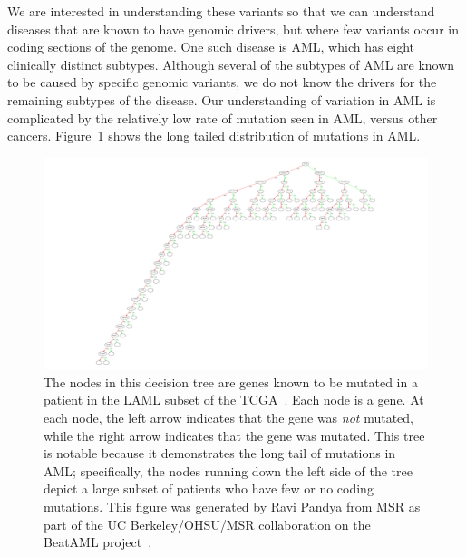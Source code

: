 \documentclass[11pt]{article} %
\begin{document}
We are interested in understanding these variants so that we can understand diseases that are
known to have genomic drivers, but where few variants occur in coding sections of the genome.
One such disease is AML, which has eight clinically distinct subtypes. Although several of the
subtypes of AML are known to be caused by specific genomic variants, we do not know the drivers
for the remaining subtypes of the disease. Our understanding of variation in AML is complicated
by the relatively low rate of mutation seen in AML, versus other cancers. Figure~\ref{fig:aml}
shows the long tailed distribution of mutations in AML.

\begin{figure}[h]
\begin{center}
\includegraphics[width=\linewidth]{aml.pdf}
\caption{The nodes in this decision tree are genes known to be mutated in a patient in the LAML
subset of the TCGA~\cite{cancer13}. Each node is a gene. At each node, the left arrow indicates
that the gene was \emph{not} mutated, while the right arrow indicates that the gene was mutated.
This tree is notable because it demonstrates the long tail of mutations in AML; specifically,
the nodes running down the left side of the tree depict a large subset of patients who have
few or no coding mutations. This figure was generated by Ravi Pandya from MSR as part of the UC
Berkeley/OHSU/MSR collaboration on the BeatAML project~\cite{paten15}.}
\label{fig:aml}
\end{center}
\end{figure}
\end{document}
